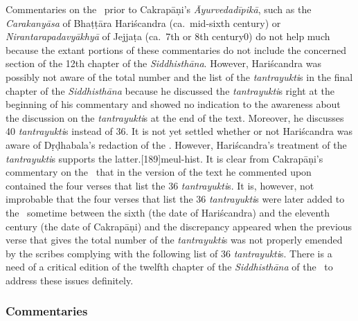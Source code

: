 Commentaries on the \CS\ prior to Cakrapāṇi's \emph{Āyurvedadīpikā},
such as the \emph{Carakanyāsa} of Bhaṭṭāra Hariścandra (ca.\ mid-sixth
century) or \emph{Nirantarapadavyākhyā} of Jejjaṭa (ca.\ 7th or 8th
century0\CE) do not help much because the extant portions of these
commentaries do not include the concerned section of the 12th chapter
of the \emph{Siddhisthāna}. However, Hariścandra was possibly not
aware of the total number and the list of the \emph{tantrayukti}s in
the final chapter of the \emph{Siddhisthāna} because he discussed the
\emph{tantrayukti}s right at the beginning of his commentary and
showed no indication to the awareness about the discussion on the
\emph{tantrayukti}s at the end of the text. Moreover, he discusses 40
\emph{tantrayukti}s instead of 36. It is not yet settled whether or
not Hariścandra was aware of Dṛḍhabala's redaction of the \CS.
However, Hariścandra's treatment of the \emph{tantrayukti}s supports
the latter.[189]{meul-hist}.  It is clear from
Cakrapāṇi's commentary on the \CS\ that in the version of the text he
commented upon contained the four verses that list the 36
\emph{tantrayukti}s. It is, however, not improbable that the four
verses that list the 36 \emph{tantrayukti}s were later added to the
\CS\ sometime between the sixth (the date of Hariścandra) and the
eleventh century (the date of Cakrapāṇi) and the discrepancy appeared
when the previous verse that gives the total number of the
\emph{tantrayukti}s was not properly emended by the scribes complying
with the following list of 36 \emph{tantrayukti}s. There is a need of
a critical edition of the twelfth chapter of the \emph{Siddhisthāna}
of the \CS\ to address these issues definitely.

\subsubsection{Commentaries}\label{commentaries}

